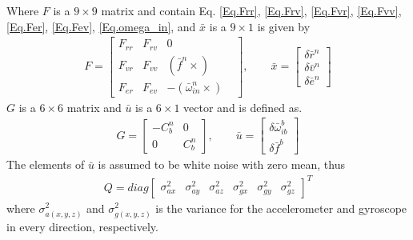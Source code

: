 Where $F$ is a $9\times 9$ matrix and contain Eq. \eqref{Eq.Frr}, \eqref{Eq.Frv}, \eqref{Eq.Fvr}, \eqref{Eq.Fvv}, \eqref{Eq.Fer}, \eqref{Eq.Fev}, \eqref{Eq.omega_in}, and $\bar{x}$ is a $9 \times 1$ is given by
\begin{align}
F=
\begin{bmatrix}
F_{rr} & F_{rv} & 0 &\\
F_{vr} & F_{vv} & (\bar{f}^n \times)\\
F_{er} & F_{ev} & -(\bar{\omega}_{in}^n\times)
\end{bmatrix},
\qquad
\bar{x}=
\begin{bmatrix}
\delta\bar{r}^n \\
\delta\bar{v}^n\\
\delta\bar{e}^n
\end{bmatrix}
\end{align}
$G$ is a $6\times6$ matrix and $\bar{u}$ is a $6 \times 1$ vector and is defined as.
\begin{align}
G=
\begin{bmatrix}
-C_b^n & 0 \\
0 & C_b^n
\end{bmatrix},
\qquad
\bar{u}=
\begin{bmatrix}
\delta \bar{\omega}_{ib}^b \\
\delta \bar{f}^b 
\end{bmatrix}
\end{align}
The elements of $\bar{u}$ is assumed to be white noise with zero mean, thus
\begin{align}
Q=diag
\begin{bmatrix}
\sigma^2_{ax} & \sigma^2_{ay} & \sigma^2_{az} & \sigma^2_{gx} & \sigma^2_{gy} & \sigma^2_{gz}
\end{bmatrix}^T
\label{Eq.Q}
\end{align}
where $\sigma^2_{a(x,y,z)}$ and $\sigma^2_{g(x,y,z)}$ is the variance for the accelerometer and gyroscope in every direction, respectively.\\
	
